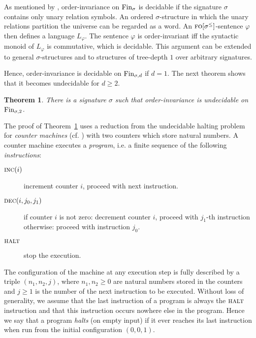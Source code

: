 \documentclass[11pt]{article}
\newtheorem{theorem}{Theorem}
\renewcommand{\phi}{\varphi}
\newcommand{\fin}{\textup{Fin}}
\newcommand{\logic}[1]{\textsc{#1}}
\newcommand{\FO}{\logic{fo}}
\newcommand{\dec}{\textsc{dec}} \newcommand{\halt}{\textsc{halt}}
\begin{document}
As mentioned by \cite{Schweikardt2013}, order-invariance on $\fin_\sigma$ is
decidable if the signature $\sigma$ contains only unary relation symbols.  An
ordered $\sigma$-structure in which the unary relations partition the universe
can be regarded as a word. An $\FO[\sigma^{\leq}]$-sentence $\phi$ then defines
a language $L_\phi$. The sentence $\phi$ is order-invariant iff the syntactic
monoid of $L_\phi$ is commutative, which is decidable.  This argument can be
extended to general $\sigma$-structures and to structures of tree-depth $1$ over
arbitrary signatures.

Hence, order-invariance is decidable on $\fin_{\sigma,d}$ if $d=1$. The next
theorem shows that it becomes undecidable for $d\geq 2$.

\begin{theorem}
  \label{thm:ordinv-undecidable}
  There is a signature $\sigma$ such that order-invariance is undecidable on $\fin_{\sigma,2}$.
\end{theorem}

The proof of Theorem~\ref{thm:ordinv-undecidable} uses a reduction from the
undecidable halting problem for \emph{counter machines} (cf. \cite{Minsky1967})
with two counters which store natural numbers. A counter machine executes a
\emph{program}, i.e. a finite sequence of the following \emph{instructions}:
\begin{description}
\item[$\textsc{inc}(i)$]  increment counter $i$, proceed with next instruction.
\item[$\dec(i,j_{0},j_{1})$] if counter $i$ is not zero: decrement counter $i$,
  proceed with $j_1$-th instruction otherwise: proceed with instruction $j_0$.
\item[$\halt{}$] stop the execution. 
\end{description}

The configuration of the machine at any execution step is fully described by
a triple $(n_1,n_2,j)$, where $n_1,n_2 \geq 0$ are natural numbers
stored in the counters and $j\geq 1$ is the number of the next
instruction to be executed. Without loss of generality, we assume
that the last instruction of a program is always the $\halt{}$
instruction and that this instruction occurs nowhere else in the
program. Hence we say that a program \emph{halts} (on empty input) if
it ever reaches its last instruction when run from the initial
configuration $(0,0,1)$. 
\end{document}
